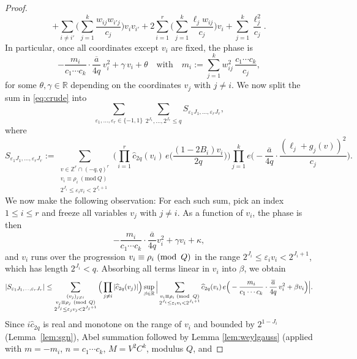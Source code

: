 \documentclass[a4paper,reqno,12pt]{amsart}
\theoremstyle{plain}
\theoremstyle{plain}
\theoremstyle{remark}
\theoremstyle{plain}
\newcommand{\RR}{\mathbb{R}}
\newcommand{\mymod}[1]{{\, \, ({\rm mod} \ \, #1)}}
\theoremstyle{plain}
\theoremstyle{plain}
\begin{document}
{\begin{proof}
$$+\sum_{i\ne i'}\Big(\sum_{j=1}^k\frac{w_{ij}w_{i'j}}{c_j}\Big)v_iv_{i'}
+2\sum_{i=1}^r\Big(\sum_{j=1}^k\frac{\ell_jw_{ij}}{c_j}\Big)v_i
+\sum_{j=1}^k\frac{\ell_j^2}{c_j}.
$$
In particular, once all coordinates except $v_{i}$ are fixed, the
phase is
$$
-\frac{m_{i}}{{c_1 \cdots c_k}}\cdot\frac{\overline a}{4q}\,v_{i}^2+\gamma\,v_{i}+\theta
{\quad \text{with} \quad} m_{i}:=\sum_{j=1}^kw_{i j}^2\,\frac {{c_1 \cdots c_k}}{c_j},
$$
for some $\theta, \gamma\in\RR$ depending on the 
coordinates $v_j$ with $j \neq i$.
We now split the sum in \eqref{eq:crude} into 
$$
\sum_{\varepsilon_1, \ldots, \varepsilon_r \in \{-1,1\}} \sum_{2^{J_1}, \ldots, 2^{J_r} \leq q} S_{\varepsilon_1 J_1, \ldots, \varepsilon_r J_{r}}{,}
$$
where
$$
S_{\varepsilon_1 J_1, \ldots, \varepsilon_r J_r} := \sum_{\substack{v \in \mathbb{Z}^r \cap (-q, q)^r \\ v_i \equiv \rho_i \ (\mathrm{mod}\ Q) \\ 2^{J_i} \leq \varepsilon_i v_i < 2^{J_{i} + 1}}}
\Big(\prod_{i = 1}^{r} \widehat{c}_{2q}(v_i)\, e \Big ( \frac{(1 - 2B_i) v_i}{2q} \Big )\Big)
\prod_{j=1}^k e \Big ( - \frac{\overline{a}}{4 q} \cdot \frac{(\ell_j + g_j(v))^2}{c_j} \Big ).
$$
We now make the following observation: For each such sum, pick an index $1 \leq i \leq r$ and freeze all
variables $v_{j}$ with $j\ne i$. As a function of $v_i$, the phase is then
$$-\frac{m_i}{c_1\cdots c_k}\cdot\frac{\overline a}{4q}v_i^2+\gamma v_i+\kappa,$$
and $v_i$ runs over the progression $v_i\equiv\rho_i\mymod Q$ in the
range $2^{J_i}\le\varepsilon_iv_i<2^{J_i+1}$, which has length
$2^{J_i}<q$. Absorbing all terms linear in $v_i$ into $\beta$, we obtain
\begin{align*}
|S_{\varepsilon_1J_1, \ldots,\varepsilon_rJ_r}| 
\le \sum_{\substack{(v_j)_{j\ne i}\\ v_j \equiv \rho_j \ (\mathrm{mod}\ Q) \\ 2^{J_j} \leq \varepsilon_j v_j < 2^{J_{j} + 1}}}
\Big(\prod_{j \neq i} |\widehat{c}_{2q}(v_j)| \Big)
 \sup_{\beta \in \mathbb{R}} \Big | \sum_{\substack{v_i \equiv \rho_i \mymod{Q} \\ 2^{J_i} \leq \varepsilon_i v_i < 2^{J_i + 1}}}
\widehat{c}_{2q}(v_i)\, e \Big ( - \frac{m_i}{c_1 \cdots c_k} \cdot \frac{\overline{a}}{4 q}\, v_i^2 + \beta v_i \Big ) \Big |.
\end{align*}
Since $i \widehat c_{2q}$ is real and monotone on the range of $v_i$
and bounded by $2^{1-J_i}$ (Lemma~\ref{lem:sgn}), Abel summation followed by Lemma \ref{lem:weylgauss}
(applied with $m=-m_i$, $n=c_1\cdots c_k$, $M=V^2C^k$, modulus $Q$, and

\end{proof}}
\end{document}
